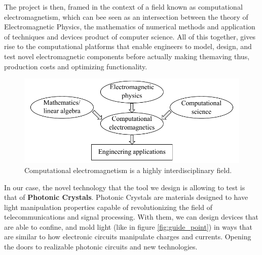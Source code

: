 The project is then, framed in the context of a field known as computational electromagnetism, which can bee seen as an intersection between the theory of Electromagnetic Physics, the mathematics of numerical methods and application of techniques and devices  product of computer science. All of this together, gives rise to the computational platforms that enable engineers to model, design, and test novel electromagnetic components before actually making themaving thus, production costs and optimizing functionality.  
\begin{figure}
\centering
\includegraphics[scale=1]{./img/interdisciplinary.pdf}
\caption{Computational electromagnetism is a highly interdisciplinary field.  \cite{Jin2010}}
\label{fig:computational}
\end{figure}
In our case, the novel technology that the tool we design is allowing to test is that of \textbf{Photonic Crystals}. Photonic Crystals are materials designed to have light manipulation properties capable of revolutionizing the field of telecommunications and signal processing. With them, we can design devices that are able to confine, and mold light (like in figure \ref{fig:guide_point}) in ways that are similar to how electronic circuits manipulate charges and currents.  Opening the doors to realizable photonic circuits and new technologies.

